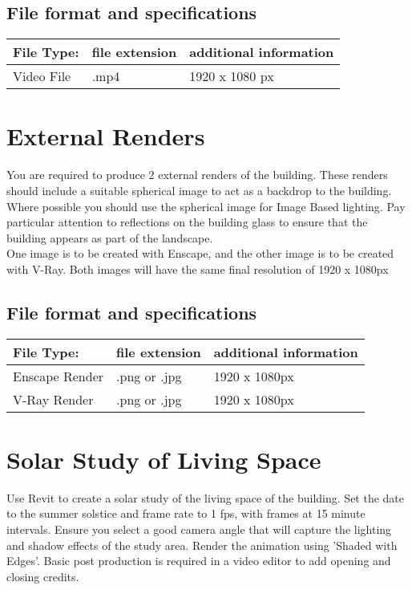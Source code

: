 \subsection*{File format and specifications}

\begin{tabularx}{\textwidth}{ |X|X|X| }
	\hline
	\textbf{File Type:} & file extension & additional information\\
	\hline 
	Video File  & .mp4 & 1920 x 1080 px \\
	\hline
\end{tabularx}



\section*{External Renders}

You are required to produce 2 external renders of the building.  These renders should include a suitable spherical image to act as a backdrop to the building.  Where possible you should use the spherical image for Image Based lighting.  Pay particular attention to reflections on the building glass to ensure that the building appears as part of the landscape.\\

One image is to be created with Enscape, and the other image is to be created with V-Ray.  Both images will have the same final resolution of 1920 x 1080px

\subsection*{File format and specifications}

\begin{tabularx}{\textwidth}{ |X|X|X| }
	\hline
	\textbf{File Type:} & file extension & additional information\\
	\hline 
	Enscape Render  & .png or .jpg & 1920 x 1080px \\
	V-Ray Render & .png or .jpg & 1920 x 1080px \\
	\hline
\end{tabularx}



\section*{Solar Study of Living Space}

Use Revit to create a solar study of the living space of the building. Set the date to the summer solstice and frame rate to 1 fps, with frames at 15 minute intervals.  Ensure you select a good camera angle that will capture the lighting and shadow effects of the study area.  Render the animation using 'Shaded with Edges'.  Basic post production is required in a video editor to add opening and closing credits.\\

